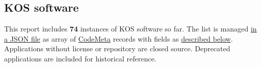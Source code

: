 \documentclass[
  DIV=10]{article}
\begin{document}
\subsection{KOS software}\label{kos-software}

This report includes \textbf{74} instances of KOS software so far. The
list is managed \href{kos-software.json}{in a JSON file} as array of
\href{https://codemeta.github.io/}{CodeMeta} records with fields as
\hyperref[metadata]{described below}. Applications without license or
repository are closed source. Deprecated applications are included for
historical reference.

\begin{longtable}[]{@{}lllllllll@{}}

\caption{\label{tbl-software}}

\tabularnewline


\end{longtable}
\end{document}
